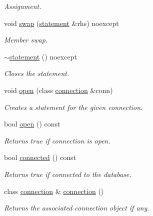 \begin{DoxyCompactItemize}
\begin{DoxyCompactList}\small\item\em Assignment. \end{DoxyCompactList}\item 
void \mbox{\hyperlink{classnanodbc_1_1statement_aaeb282293b92d0c9c0dc9e6452c91695}{swap}} (\mbox{\hyperlink{classnanodbc_1_1statement}{statement}} \&rhs) noexcept
\begin{DoxyCompactList}\small\item\em Member swap. \end{DoxyCompactList}\item 
\mbox{\hyperlink{classnanodbc_1_1statement_aa30610291426567164aab50aeacaa537}{$\sim$statement}} () noexcept
\begin{DoxyCompactList}\small\item\em Closes the statement. \end{DoxyCompactList}\item 
void \mbox{\hyperlink{classnanodbc_1_1statement_a473ec2d726f6d8acc42ce0f5f6d1b967}{open}} (class \mbox{\hyperlink{classnanodbc_1_1connection}{connection}} \&conn)
\begin{DoxyCompactList}\small\item\em Creates a statement for the given connection. \end{DoxyCompactList}\item 
bool \mbox{\hyperlink{classnanodbc_1_1statement_a7e34012ad0120d8c3780bea1d29c3903}{open}} () const
\begin{DoxyCompactList}\small\item\em Returns true if connection is open. \end{DoxyCompactList}\item 
bool \mbox{\hyperlink{classnanodbc_1_1statement_aa3e77eb9771cf5d8478208b0a9e2c59a}{connected}} () const
\begin{DoxyCompactList}\small\item\em Returns true if connected to the database. \end{DoxyCompactList}\item 
class \mbox{\hyperlink{classnanodbc_1_1connection}{connection}} \& \mbox{\hyperlink{classnanodbc_1_1statement_a4eb59e468b303a9d6acbe3ba1c408495}{connection}} ()
\begin{DoxyCompactList}\small\item\em Returns the associated connection object if any. \end{DoxyCompactList}\item 

\end{DoxyCompactItemize}

